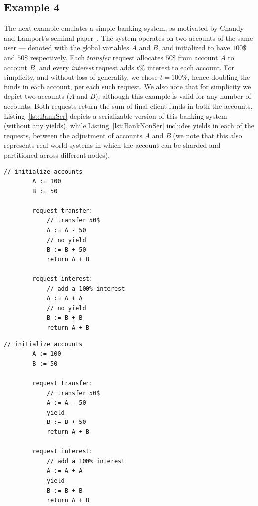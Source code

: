 	
	
\subsection{Example 4}

The next example emulates a simple banking system, as motivated by Chandy and Lamport's seminal paper~\cite{ChLa85}. The system operates on two accounts of the same user --- denoted with the global variables $A$ and $B$, and initialized to have $100\$$ and $50\$$ respectively. 
%
Each \textit{transfer} request allocates $50\$$ from account $A$ to account $B$, and every \textit{interest} request adds $t\%$ interest to each account. For simplicity, and without loss of generality, we chose $t=100\%$, hence doubling the funds in each account, per each such request. We also note that for simplicity we depict two accounts ($A$ and $B$), although this example is valid for any number of accounts.
%
Both requests return the sum of final client funds in both the accounts.  
%
Listing~\ref{lst:BankSer} depicts a serializable version of this banking system (without any yields), while Listing~\ref{lst:BankNonSer} includes yields in each of the requests, between the adjustment of accounts $A$ and $B$ (we note that this also represents real world systems in which the account can be sharded and partitioned across different nodes).
%


\noindent
\begin{minipage}[t]{0.45\textwidth}
	\begin{lstlisting}[caption={bank (serializable)},
		label={lst:BankSer}]
	    // initialize accounts
	    A := 100
	    B := 50
	    
	    request transfer: 
	        // transfer 50$
	        A := A - 50
	        // no yield
	        B := B + 50
	        return A + B
				
	    request interest: 
	        // add a 100% interest
	        A := A + A
	        // no yield
	        B := B + B
	        return A + B	      		        
			\end{lstlisting}
\end{minipage}
\hfill
\begin{minipage}[t]{0.45\textwidth}
	\begin{lstlisting}[caption={bank with yields (non serializable)},
		label={lst:BankNonSer}]
	    // initialize accounts
	    A := 100
	    B := 50
			
	    request transfer: 
	        // transfer 50$
	        A := A - 50
	        yield
	        B := B + 50
	        return A + B
	
	    request interest: 
	        // add a 100% interest
	        A := A + A
	        yield
	        B := B + B
	        return A + B	      		        
		\end{lstlisting}
\end{minipage}
	

